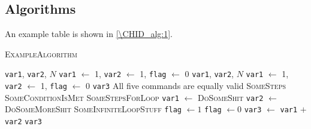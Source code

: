 \subsection{Algorithms}
An example table is shown in \ref{\CHID_alg:1}.
\begin{algorithm}[t]
	\caption{\textsc{ExampleAlgorithm}}\label{\CHID_alg:1}
	\begin{algorithmic}[1]
		\Require \texttt{var1}, \texttt{var2}, $N$ 
		\Ensure \texttt{var1} $\gets$ 1, \texttt{var2} $\gets$ 1, \texttt{flag} $\gets$ 0 
		\Input \texttt{var1}, \texttt{var2}, $N$
		\Init \texttt{var1} $\gets$ 1, \texttt{var2} $\gets$ 1, \texttt{flag} $\gets$ 0 
		\Output \texttt{var3}
		\Comment All five commands are equally valid
		\Repeat {}
		\State \textsc{SomeSteps}
		\Until \textsc{SomeConditionIsMet}	
		 
		\State \textsc{SomeStepsForLoop}
		\EndFor
		 
		\State \texttt{var1} $\gets$ \textsc{DoSomeShit}
		\State \texttt{var2} $\gets$ \textsc{DoSomeMoreShit}
		\EndWhile
		\Loop {}
		\State \textsc{SomeInfiniteLoopStuff}
		\EndLoop
		\State \texttt{flag} $\gets 1$
		\State \texttt{flag} $\gets 0$
		\Else
		\State \texttt{var3} $\gets$ \texttt{var1} $+$ \texttt{var2}
		\EndIf
		\State {}
		\State \Return \texttt{var3}
	\end{algorithmic}
\end{algorithm}

\lipsum[1-4]